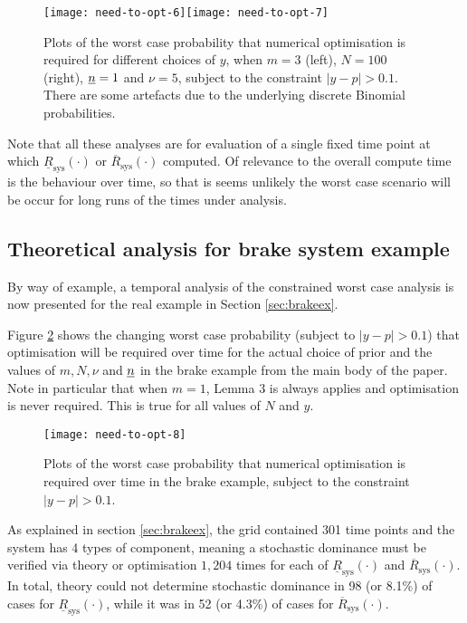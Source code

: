 \documentclass[12pt, a4paper]{elsarticle}
\newcommand{\ul}[1]{\underline{#1}}
\newcommand{\ol}[1]{\overline{#1}}
\newcommand{\lRsys}{\ul{R}_\text{sys}}
\newcommand{\uRsys}{\ol{R}_\text{sys}}
\begin{document}
\begin{figure}
\texttt{[image: need-to-opt-6]}\texttt{[image: need-to-opt-7]}
\caption{Plots of the worst case probability that numerical optimisation is required for different choices of $y$, when $m=3$ (left), $N=100$ (right), $\nl=1$ and $\nu=5$, subject to the constraint $|y-p|>0.1$.  There are some artefacts due to the underlying discrete Binomial probabilities.}
\label{fig:need-to-opt-67}
\end{figure}

Note that all these analyses are for evaluation of a single fixed time point at which $\lRsys(\cdot)$ or $\uRsys(\cdot)$ computed.  Of relevance to the overall compute time is the behaviour over time, so that is seems unlikely the worst case scenario will be occur for long runs of the times under analysis.

\subsection{Theoretical analysis for brake system example}

By way of example, a temporal analysis of the constrained worst case analysis is now presented for the real example in Section \ref{sec:brakeex}.

Figure \ref{fig:need-to-opt-8} shows the changing worst case probability (subject to $|y-p|>0.1$) that optimisation will be required over time for the actual choice of prior and the values of $m, N, \nu$ and $\nl$ in the brake example from the main body of the paper.  Note in particular that when $m=1$, Lemma 3 is always applies and optimisation is never required.  This is true for all values of $N$ and $y$.

\begin{figure}
\texttt{[image: need-to-opt-8]}
\caption{Plots of the worst case probability that numerical optimisation is required over time in the brake example, subject to the constraint $|y-p|>0.1$.}
\label{fig:need-to-opt-8}
\end{figure}

As explained in section \ref{sec:brakeex}, the grid contained 301 time points and the system has 4 types of component, meaning a stochastic dominance must be verified via theory or optimisation $1,204$ times for each of $\lRsys(\cdot)$ and $\uRsys(\cdot)$.  In total, theory could not determine stochastic dominance in 98 (or 8.1\%) of cases for $\lRsys(\cdot)$, while it was in 52 (or 4.3\%) of cases for $\uRsys(\cdot)$.
\end{document}
